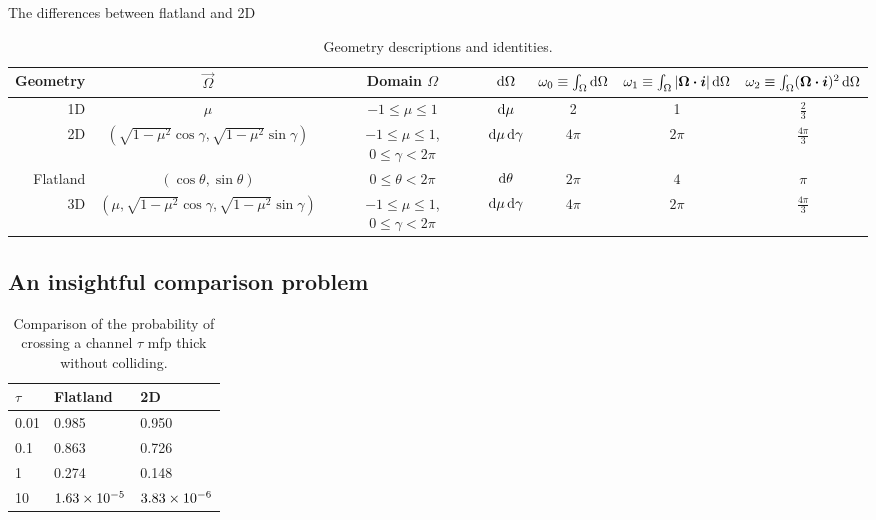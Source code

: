 The differences between flatland and 2D 
\begin{sidewaystable}[hp]
  \centering
  \renewcommand*{\arraystretch}{1.5}
  \begin{tabular}{rcccccc}
\toprule
   Geometry & $\vec{\Omega}$ & Domain $\Omega$ & $\mathop{}\!\mathrm{d}\Omega$
   & $\omega_0 \equiv \int_\Omega \mathop{}\!\mathrm{d}\Omega$
   & $\omega_1 \equiv \int_\Omega \left| \bm{\Omega}\bm{\cdot}\bm{i} \right| \mathop{}\!\mathrm{d}\Omega$
   & $\omega_2 \equiv \int_\Omega (\bm{\Omega}\bm{\cdot}\bm{i})^2 \mathop{}\!\mathrm{d}\Omega$
\\ \midrule
   1D & $\mu$ & $-1 \le \mu \le 1$ & $\mathop{}\!\mathrm{d}\mu$
   & 2 & 1 & $\frac{2}{3}$
   \\
   2D & $(\sqrt{1-\mu^2} \cos \gamma, \sqrt{1-\mu^2} \sin \gamma)$
   & $-1 \le \mu \le 1$, $0 \le \gamma < 2\pi$ & $\mathop{}\!\mathrm{d}\mu \mathop{}\!\mathrm{d} \gamma$
   & $4\pi$ & $2\pi$ & $\frac{4\pi}{3}$
   \\
   Flatland & $(\cos \theta, \sin \theta)$
   & $0 \le \theta < 2\pi$ & $\mathop{}\!\mathrm{d} \theta$
   & $2\pi$ & $4$ & $\pi$
   \\
   3D & $(\mu, \sqrt{1-\mu^2} \cos \gamma, \sqrt{1-\mu^2} \sin \gamma)$
   & $-1 \le \mu \le 1$, $0 \le \gamma < 2\pi$ & $\mathop{}\!\mathrm{d}\mu \mathop{}\!\mathrm{d} \gamma$
   & $4\pi$ & $2\pi$ & $\frac{4\pi}{3}$
 \\
\bottomrule
  \end{tabular}
  \caption{Geometry descriptions and identities.}
  \label{tab:geometry}
\end{sidewaystable}

\subsection{An insightful comparison problem}

\begin{table}[htb]
  \centering
  \begin{tabular}{lll}
\toprule
\phantom{10}$\tau$ & Flatland & 2D
\\ \midrule
\phantom{1}0.01 & 0.985 & 0.950 \\
\phantom{1}0.1 & 0.863 & 0.726 \\
\phantom{1}1 & 0.274 & 0.148 \\
10 & $1.63\times 10^{-5}$ & $3.83\times 10^{-6}$
 \\
\bottomrule
  \end{tabular}
  \caption{Comparison of the probability of crossing a channel $\tau$ mfp thick
  without colliding.}
  \label{tab:collision}
\end{table}


